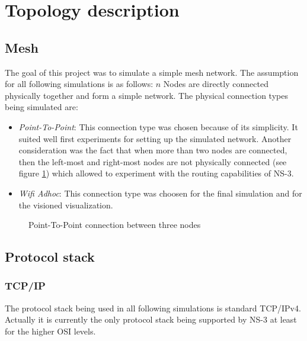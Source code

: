 
\section{Topology description}


\subsection{Mesh}

The goal of this project was to simulate a simple mesh network. The
assumption for all following simulations is as follows: $n$ Nodes
are directly connected physically together and form a simple network.
The physical connection types being simulated are:
\begin{itemize}
\item \textit{Point-To-Point}: This connection type was chosen because of
its simplicity. It suited well first experiments for setting up the
simulated network. Another consideration was the fact that when more
than two nodes are connected, then the left-most and right-most nodes
are not physically connected (see figure \ref{fig:Point-To-Point-connection-between})
which allowed to experiment with the routing capabilities of NS-3.
\item \textit{Wifi Adhoc}: This connection type was choosen for the final
simulation and for the visioned visualization.
\end{itemize}
%
\begin{figure}
\begin{centering}

\par\end{centering}

\caption{\label{fig:Point-To-Point-connection-between}Point-To-Point connection
between three nodes}

\end{figure}



\subsection{Protocol stack}


\subsubsection{TCP/IP}

The protocol stack being used in all following simulations is standard
TCP/IPv4. Actually it is currently the only protocol stack being supported
by NS-3 at least for the higher OSI levels.


